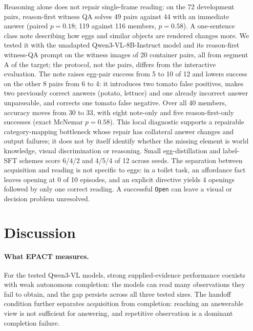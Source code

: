 \documentclass{article}
\begin{document}
Reasoning alone does not repair single-frame reading: on the 72 development pairs, reason-first witness QA solves 49 pairs against 44 with an immediate answer (paired $p=0.18$; 119 against 116 members, $p=0.58$). A one-sentence class note describing how eggs and similar objects are rendered changes more. We tested it with the unadapted Qwen3-VL-8B-Instruct model and its reason-first witness-QA prompt on the witness images of 20 container pairs, all from segment A of the target; the protocol, not the pairs, differs from the interactive evaluation. The note raises egg-pair success from 5 to 10 of 12 and lowers success on the other 8 pairs from 6 to 4: it introduces two tomato false positives, makes two previously correct answers (potato, lettuce) and one already incorrect answer unparseable, and corrects one tomato false negative. Over all 40 members, accuracy moves from 30 to 33, with eight note-only and five reason-first-only successes (exact McNemar $p=0.58$). This local diagnostic supports a repairable category-mapping bottleneck whose repair has collateral answer changes and output failures; it does not by itself identify whether the missing element is world knowledge, visual discrimination or reasoning. Small egg-distillation and label-SFT schemes score 6/4/2 and 4/5/4 of 12 across seeds. The separation between acquisition and reading is not specific to eggs: in a toilet task, an affordance fact leaves opening at 0 of 10 episodes, and an explicit directive yields 4 openings followed by only one correct reading. A successful \texttt{Open} can leave a visual or decision problem unresolved.

\section{Discussion}
\paragraph{What EPACT measures.} For the tested Qwen3-VL models, strong supplied-evidence performance coexists with weak autonomous completion: the models can read many observations they fail to obtain, and the gap persists across all three tested sizes. The handoff condition further separates acquisition from completion: reaching an answerable view is not sufficient for answering, and repetitive observation is a dominant completion failure.
\end{document}
